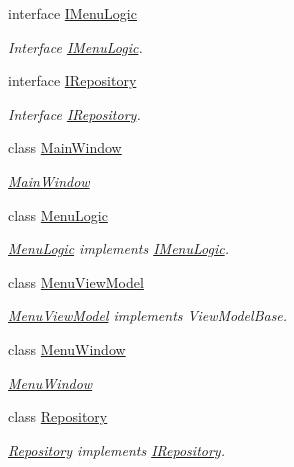 \begin{DoxyCompactItemize}
interface \mbox{\hyperlink{interface_game_1_1_i_menu_logic}{I\+Menu\+Logic}}
\begin{DoxyCompactList}\small\item\em Interface \mbox{\hyperlink{interface_game_1_1_i_menu_logic}{I\+Menu\+Logic}}. \end{DoxyCompactList}\item 
interface \mbox{\hyperlink{interface_game_1_1_i_repository}{I\+Repository}}
\begin{DoxyCompactList}\small\item\em Interface \mbox{\hyperlink{interface_game_1_1_i_repository}{I\+Repository}}. \end{DoxyCompactList}\item 
class \mbox{\hyperlink{class_game_1_1_main_window}{Main\+Window}}
\begin{DoxyCompactList}\small\item\em \mbox{\hyperlink{class_game_1_1_main_window}{Main\+Window}} \end{DoxyCompactList}\item 
class \mbox{\hyperlink{class_game_1_1_menu_logic}{Menu\+Logic}}
\begin{DoxyCompactList}\small\item\em \mbox{\hyperlink{class_game_1_1_menu_logic}{Menu\+Logic}} implements \mbox{\hyperlink{interface_game_1_1_i_menu_logic}{I\+Menu\+Logic}}. \end{DoxyCompactList}\item 
class \mbox{\hyperlink{class_game_1_1_menu_view_model}{Menu\+View\+Model}}
\begin{DoxyCompactList}\small\item\em \mbox{\hyperlink{class_game_1_1_menu_view_model}{Menu\+View\+Model}} implements View\+Model\+Base. \end{DoxyCompactList}\item 
class \mbox{\hyperlink{class_game_1_1_menu_window}{Menu\+Window}}
\begin{DoxyCompactList}\small\item\em \mbox{\hyperlink{class_game_1_1_menu_window}{Menu\+Window}} \end{DoxyCompactList}\item 
class \mbox{\hyperlink{class_game_1_1_repository}{Repository}}
\begin{DoxyCompactList}\small\item\em \mbox{\hyperlink{class_game_1_1_repository}{Repository}} implements \mbox{\hyperlink{interface_game_1_1_i_repository}{I\+Repository}}. \end{DoxyCompactList}\item 

\end{DoxyCompactItemize}
